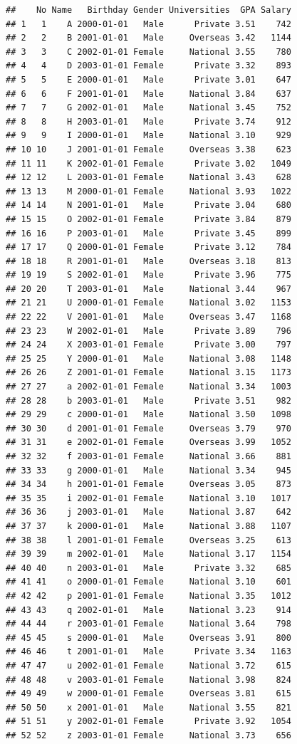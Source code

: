 \documentclass[
]{book}
\begin{document}
\begin{verbatim}
##    No Name   Birthday Gender Universities  GPA Salary
## 1   1    A 2000-01-01   Male      Private 3.51    742
## 2   2    B 2001-01-01   Male     Overseas 3.42   1144
## 3   3    C 2002-01-01 Female     National 3.55    780
## 4   4    D 2003-01-01 Female      Private 3.32    893
## 5   5    E 2000-01-01   Male      Private 3.01    647
## 6   6    F 2001-01-01   Male     National 3.84    637
## 7   7    G 2002-01-01   Male     National 3.45    752
## 8   8    H 2003-01-01   Male      Private 3.74    912
## 9   9    I 2000-01-01   Male     National 3.10    929
## 10 10    J 2001-01-01 Female     Overseas 3.38    623
## 11 11    K 2002-01-01 Female      Private 3.02   1049
## 12 12    L 2003-01-01 Female     National 3.43    628
## 13 13    M 2000-01-01 Female     National 3.93   1022
## 14 14    N 2001-01-01   Male      Private 3.04    680
## 15 15    O 2002-01-01 Female      Private 3.84    879
## 16 16    P 2003-01-01   Male      Private 3.45    899
## 17 17    Q 2000-01-01 Female      Private 3.12    784
## 18 18    R 2001-01-01   Male     Overseas 3.18    813
## 19 19    S 2002-01-01   Male      Private 3.96    775
## 20 20    T 2003-01-01   Male     National 3.44    967
## 21 21    U 2000-01-01 Female     National 3.02   1153
## 22 22    V 2001-01-01   Male     Overseas 3.47   1168
## 23 23    W 2002-01-01   Male      Private 3.89    796
## 24 24    X 2003-01-01 Female      Private 3.00    797
## 25 25    Y 2000-01-01   Male     National 3.08   1148
## 26 26    Z 2001-01-01 Female     National 3.15   1173
## 27 27    a 2002-01-01 Female     National 3.34   1003
## 28 28    b 2003-01-01   Male      Private 3.51    982
## 29 29    c 2000-01-01   Male     National 3.50   1098
## 30 30    d 2001-01-01 Female     Overseas 3.79    970
## 31 31    e 2002-01-01 Female     Overseas 3.99   1052
## 32 32    f 2003-01-01 Female     National 3.66    881
## 33 33    g 2000-01-01   Male     National 3.34    945
## 34 34    h 2001-01-01 Female     Overseas 3.05    873
## 35 35    i 2002-01-01 Female     National 3.10   1017
## 36 36    j 2003-01-01   Male     National 3.87    642
## 37 37    k 2000-01-01   Male     National 3.88   1107
## 38 38    l 2001-01-01 Female     Overseas 3.25    613
## 39 39    m 2002-01-01   Male     National 3.17   1154
## 40 40    n 2003-01-01   Male      Private 3.32    685
## 41 41    o 2000-01-01 Female     National 3.10    601
## 42 42    p 2001-01-01 Female     National 3.35   1012
## 43 43    q 2002-01-01   Male     National 3.23    914
## 44 44    r 2003-01-01 Female     National 3.64    798
## 45 45    s 2000-01-01   Male     Overseas 3.91    800
## 46 46    t 2001-01-01   Male      Private 3.34   1163
## 47 47    u 2002-01-01 Female     National 3.72    615
## 48 48    v 2003-01-01 Female     National 3.98    824
## 49 49    w 2000-01-01 Female     Overseas 3.81    615
## 50 50    x 2001-01-01   Male     National 3.55    821
## 51 51    y 2002-01-01 Female      Private 3.92   1054
## 52 52    z 2003-01-01 Female     National 3.73    656
\end{verbatim}
\end{document}
